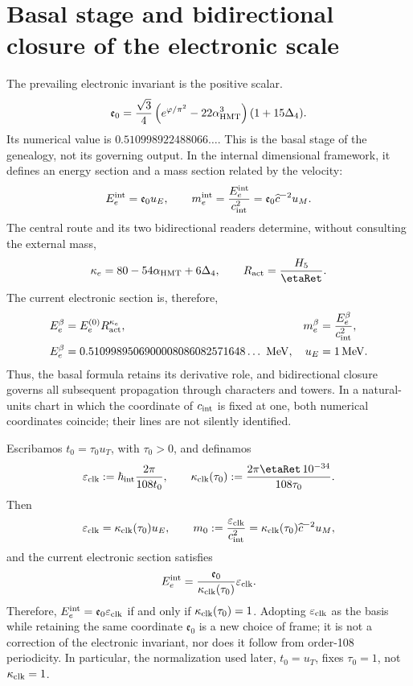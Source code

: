 \section{Basal stage and bidirectional closure of the electronic scale}

The prevailing electronic invariant is the positive scalar.
\[
 \mathfrak e_0=
 \frac{\sqrt3}{4}
 \left(e^{\varphi/\pi^2}-22\alpha_{\rm HMT}^3\right)
 (1+15\Delta_4).
\]
Its numerical value is
\(0.510998922488066\ldots\). This is the basal stage of the genealogy, not its
governing output. In the internal dimensional framework, it defines an energy section
and a mass section related by the velocity:
\begin{equation}
 E_e^{\rm int}=\mathfrak e_0u_E,
 \qquad
 m_e^{\rm int}=\frac{E_e^{\rm int}}{c_{\rm int}^{2}}
 =\mathfrak e_0\widehat c^{-2}u_M.
 \label{eq:electron-line-valued}
\end{equation}
The central route and its two bidirectional readers determine, without consulting
the external mass,
\[
 \kappa_e=80-54\alpha_{\rm HMT}+6\Delta_4,
 \qquad R_{\rm act}=\frac{H_5}{\etaRet}.
\]
The current electronic section is, therefore,
\begin{equation}
 \begin{aligned}
 E_e^{\beta}&=E_e^{(0)}R_{\rm act}^{\kappa_e},
 &m_e^{\beta}&=\frac{E_e^{\beta}}{c_{\rm int}^{2}},\\
 E_e^\beta
 &=0.5109989506900008086082571648\ldots\ {\rm MeV},
 &u_E&=1\,{\rm MeV}.
 \end{aligned}
 \label{eq:electron-line-valued-beta}
\end{equation}
Thus, the basal formula retains its derivative role, and bidirectional
closure governs all subsequent propagation through characters and towers.
In a natural-units chart in which the coordinate of \(c_{\rm int}\) is fixed
at one, both numerical coordinates coincide; their lines are not silently
identified.

\begin{proposition}
\label{prop:no-identificacion-base-reloj-rev8}
Escribamos \(t_0=\tau_0u_T\), with \(\tau_0>0\), and definamos
\[
 \varepsilon_{\rm clk}
 :=\hbar_{\rm int}\frac{2\pi}{108t_0},
 \qquad
 \kappa_{\rm clk}(\tau_0)
 :=\frac{2\pi\etaRet\,10^{-34}}{108\tau_0}.
\]
Then
\[
 \varepsilon_{\rm clk}=\kappa_{\rm clk}(\tau_0)u_E,
 \qquad
 m_0:=\frac{\varepsilon_{\rm clk}}{c_{\rm int}^2}
 =\kappa_{\rm clk}(\tau_0)\widehat c^{-2}u_M,
\]
and the current electronic section satisfies
\[
 E_e^{\rm int}
 =\frac{\mathfrak e_0}{\kappa_{\rm clk}(\tau_0)}
  \varepsilon_{\rm clk}.
\]
Therefore, \(E_e^{\rm int}=\mathfrak e_0\varepsilon_{\rm clk}\) if and only if
\(\kappa_{\rm clk}(\tau_0)=1\). Adopting \(\varepsilon_{\rm clk}\) as the basis
while retaining the same coordinate \(\mathfrak e_0\) is a new choice of
frame; it is not a correction of the electronic invariant, nor does it follow
from order-108 periodicity. In particular, the normalization used
later, \(t_0=u_T\), fixes \(\tau_0=1\), not
\(\kappa_{\rm clk}=1\).
\end{proposition}

